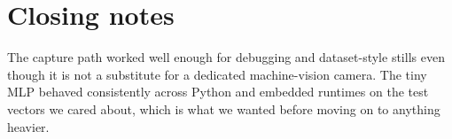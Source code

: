 \documentclass[11pt]{article}
\begin{document}
\section{Closing notes}
The capture path worked well enough for debugging and dataset-style stills even though it is not a substitute for a dedicated machine-vision camera. The tiny MLP behaved consistently across Python and embedded runtimes on the test vectors we cared about, which is what we wanted before moving on to anything heavier.
\end{document}
